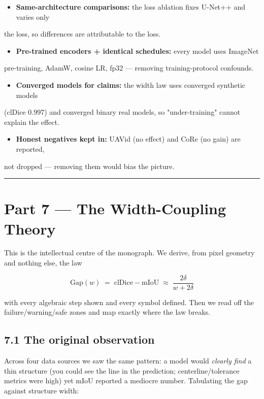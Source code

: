 \documentclass[11pt]{article}
\begin{document}
\begin{itemize}\setlength{\itemsep}{1pt}
\item \textbf{Same-architecture comparisons:} the loss ablation fixes U-Net++ and varies only
\end{itemize}
  the loss, so differences are attributable to the loss.
\begin{itemize}\setlength{\itemsep}{1pt}
\item \textbf{Pre-trained encoders + identical schedules:} every model uses ImageNet
\end{itemize}
  pre-training, AdamW, cosine LR, fp32 --- removing training-protocol confounds.
\begin{itemize}\setlength{\itemsep}{1pt}
\item \textbf{Converged models for claims:} the width law uses converged synthetic models
\end{itemize}
  (clDice 0.997) and converged binary real models, so "under-training" cannot explain   the effect.
\begin{itemize}\setlength{\itemsep}{1pt}
\item \textbf{Honest negatives kept in:} UAVid (no effect) and CoRe (no gain) are reported,
\end{itemize}
  not dropped --- removing them would bias the picture.

\vspace{3pt}\hrule\vspace{3pt}
\clearpage\section*{Part 7 --- The Width-Coupling Theory}

This is the intellectual centre of the monograph. We derive, from pixel geometry and nothing else, the law

\[\boxed{\;\text{Gap}(w)\;=\;\text{clDice}-\text{mIoU}\;\approx\;\frac{2\delta}{w+2\delta}\;}\]

with every algebraic step shown and every symbol defined. Then we read off the failure/warning/safe zones and map exactly where the law breaks.

\subsection*{7.1 The original observation}

Across four data sources we saw the same pattern: a model would \textit{clearly find} a thin structure (you could see the line in the prediction; centerline/tolerance metrics were high) yet mIoU reported a mediocre number. Tabulating the gap against structure width:
\end{document}
